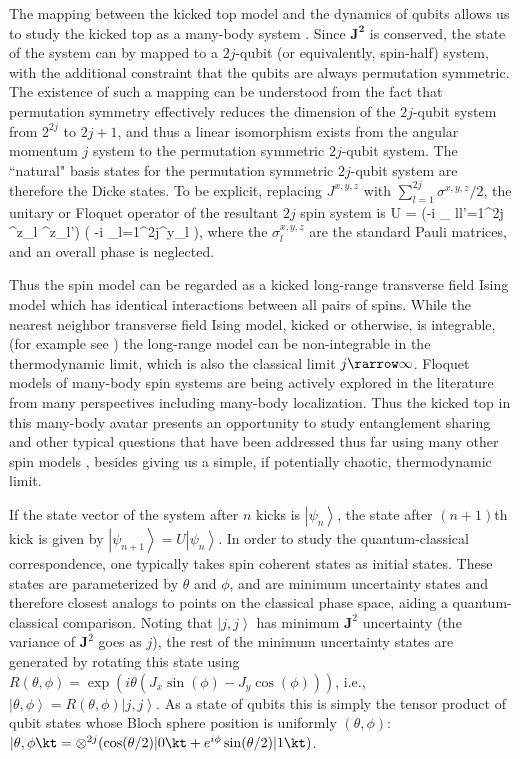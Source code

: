 \documentclass[pre,aps,showpacs,showkeys,twocolumn]{revtex4-1}
\newcommand\ket[1]{\left|#1\right\rangle}
\theoremstyle{definition}
\theoremstyle{remark}
\begin{document}
The mapping between the kicked top model and the dynamics of qubits allows us to study the kicked top as a many-body system \cite{Wang2004, mgtg15, Neill16, Madhok2018_corr}. Since $\bm{J^2}$ is conserved, the state of the system can by mapped to a $2j$-qubit (or equivalently, spin-half) system, with the additional constraint that the qubits are always permutation symmetric. The existence of such a mapping can be understood from the fact that permutation symmetry effectively reduces the dimension of the $2j$-qubit system from $2^{2j}$ to $2j + 1$, and thus a linear isomorphism exists from the angular momentum $j$ system to the permutation symmetric $2j$-qubit system. The ``natural" basis states for the permutation symmetric $2j$-qubit system are therefore the Dicke states.
To be explicit, replacing $J^{x,y,z}$ with $\sum_{l=1}^{2j} \sigma^{x,y,z}/2$, the unitary or Floquet operator of the resultant $2j$ spin system is 
\beq
U = \exp\left(-i   \sum_{ l\ne l'=1}^{2j} \sigma^z_{l} \sigma^z_{l'}\right)
      \exp\left( -i  \sum_{l=1}^{2j}\sigma^y_l \right),
\eeq
where the $\sigma^{x,y,z}_l$ are the standard Pauli matrices, and an overall phase is neglected. 

Thus the spin model can be regarded as a kicked long-range transverse field Ising model which has identical interactions between all pairs of spins. While the nearest neighbor transverse field Ising model, kicked or otherwise, is integrable, (for example see \cite{prosen2000exact}) the long-range model can be non-integrable in the thermodynamic limit, which is also the classical limit $j \rarrow \infty$. Floquet models of many-body spin systems are being actively explored in the literature from many perspectives including many-body localization. Thus the kicked top in this many-body avatar presents an opportunity to study entanglement sharing and other typical questions that have been addressed thus far using many other spin models \cite{VedralRMPmanybody}, besides giving us a simple, if potentially chaotic, thermodynamic limit.

If the state vector of the system after $n$ kicks is $\ket{\psi_n}$, the state after $(n+1)$th kick is given by $\ket{\psi_{n+1}} = U \ket{\psi_n}$. In order to study the quantum-classical correspondence, one typically takes spin coherent states \cite{Glauber, Puri} as initial states. These states are parameterized by $\theta$ and $\phi$, and are minimum uncertainty states and therefore closest analogs to points on the classical phase space, aiding a quantum-classical comparison. Noting that $\ket{j, j}$ has minimum $\bm{J}^2$ uncertainty (the variance of $\bm{J}^2$ goes as $j$), the rest of the minimum uncertainty states are generated by rotating this state using $R(\theta, \phi) = \exp{\left(i \theta (J_x \sin(\phi) - J_y \cos(\phi))\right)}$, i.e., $\ket{\theta, \phi} = R(\theta, \phi) \ket{j, j}$. As a state of qubits this is simply the tensor product of qubit states whose Bloch sphere position is uniformly $(\theta, \phi)$: $|\theta,\phi\kt =\otimes^{2j} (\cos(\theta/2) |0 \kt +e^{i \phi} \sin(\theta/2) |1\kt)$.
\end{document}
